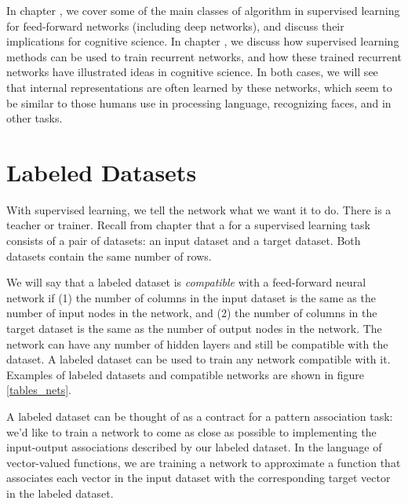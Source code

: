 In chapter , we cover some of the main classes of algorithm in supervised learning for feed-forward networks (including deep networks), and discuss their implications for cognitive science. In chapter , we discuss how supervised learning methods can be used to train recurrent networks, and how these trained recurrent networks have illustrated ideas in cognitive science. In both cases, we will see that internal representations are often learned by these networks, which seem to be similar to those humans use in processing language, recognizing faces, and in other tasks.


\section{Labeled Datasets}\label{supervised_datasets}

With supervised learning, we tell the network what we want it to do. There is a teacher or trainer. Recall from chapter  that a  for a supervised learning task consists of a pair of datasets: an input dataset and a target dataset. Both datasets contain the same number of rows.

We will say that a labeled dataset is \emph{compatible} with a feed-forward neural network if (1) the number of columns in the input dataset is the same as the number of input nodes in the network, and (2) the number of columns in the target dataset is the same as the number of output nodes in the network. The network can have any number of hidden layers and still be compatible with the dataset. A labeled dataset can be used to train any network compatible with it. Examples of labeled datasets and compatible networks are shown in figure \ref{tables_nets}.

A labeled dataset can be thought of as a contract for a pattern association task: we'd like to train a network to come as close as possible to implementing the input-output associations described by our labeled dataset. In the language of vector-valued functions, we are training a network to approximate a function that associates each vector in the input dataset with the corresponding target vector in the labeled dataset.

